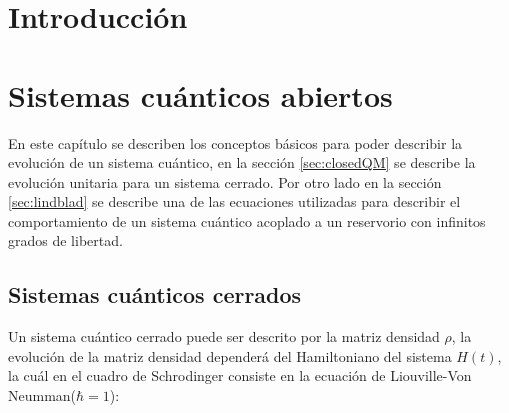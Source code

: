 %
%

\chapter{Introducción}





\chapter{Sistemas cuánticos abiertos}

En este capítulo se describen los conceptos básicos para poder describir la evolución de un sistema cuántico, en la sección \ref{sec:closedQM} se describe la evolución unitaria para un sistema cerrado.  Por otro lado en la sección \ref{sec:lindblad} se describe una de las ecuaciones utilizadas para describir el comportamiento de un sistema cuántico acoplado a un reservorio con infinitos grados de libertad.


\section{Sistemas cuánticos cerrados}
Un sistema cuántico cerrado puede ser descrito por la matriz densidad $\rho$, la evolución de la matriz densidad dependerá del Hamiltoniano del sistema $H(t)$, la cuál en el cuadro de Schrodinger consiste en la ecuación de Liouville-Von Neumman($\hbar = 1$)\cite{breuer2002theory}:

